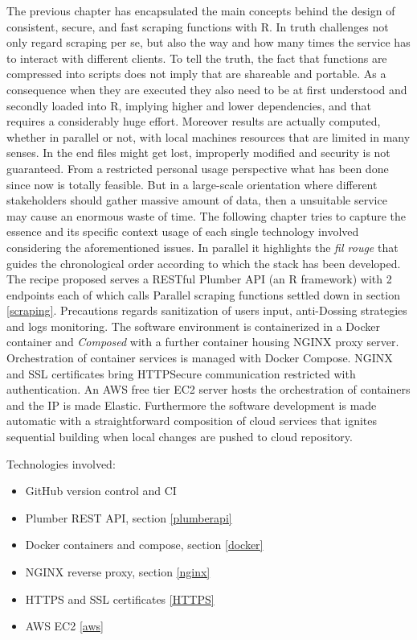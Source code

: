 \documentclass[
  12pt,
  a4paper,
  oneside]{book}
\providecommand{\tightlist}{%
  \setlength{\itemsep}{0pt}\setlength{\parskip}{0pt}}
\theoremstyle{definition}
\theoremstyle{definition}
\theoremstyle{definition}
\theoremstyle{remark}
\begin{document}
The previous chapter has encapsulated the main concepts behind the design of consistent, secure, and fast scraping functions with R. In truth challenges not only regard scraping per se, but also the way and how many times the service has to interact with different clients. To tell the truth, the fact that functions are compressed into scripts does not imply that are shareable and portable. As a consequence when they are executed they also need to be at first understood and secondly loaded into R, implying higher and lower dependencies, and that requires a considerably huge effort. Moreover results are actually computed, whether in parallel or not, with local machines resources that are limited in many senses. In the end files might get lost, improperly modified and security is not guaranteed.
From a restricted personal usage perspective what has been done since now is totally feasible. But in a large-scale orientation where different stakeholders should gather massive amount of data, then a unsuitable service may cause an enormous waste of time.
The following chapter tries to capture the essence and its specific context usage of each single technology involved considering the aforementioned issues. In parallel it highlights the \emph{fil rouge} that guides the chronological order according to which the stack has been developed.
The recipe proposed serves a RESTful Plumber API (an R framework) with 2 endpoints each of which calls Parallel scraping functions settled down in section \ref{scraping}. Precautions regards sanitization of users input, anti-Dossing strategies and logs monitoring. The software environment is containerized in a Docker container and \emph{Composed} with a further container housing NGINX proxy server. Orchestration of container services is managed with Docker Compose. NGINX and SSL certificates bring HTTPSecure communication restricted with authentication. An AWS free tier EC2 server hosts the orchestration of containers and the IP is made Elastic. Furthermore the software development is made automatic with a straightforward composition of cloud services that ignites sequential building when local changes are pushed to cloud repository.

Technologies involved:

\begin{itemize}
\tightlist
\item
  GitHub version control and CI
\item
  Plumber REST API, section \ref{plumberapi}
\item
  Docker containers and compose, section \ref{docker}
\item
  NGINX reverse proxy, section \ref{nginx}
\item
  HTTPS and SSL certificates \ref{HTTPS}
\item
  AWS EC2 \ref{aws}
\end{itemize}
\end{document}
